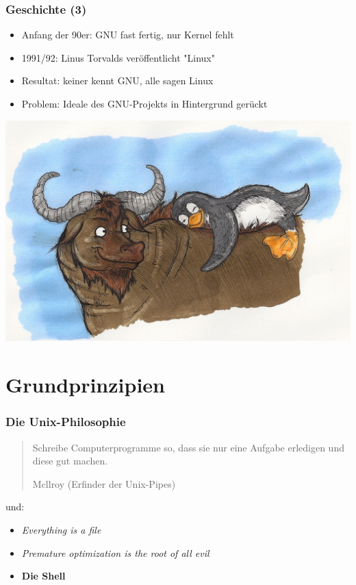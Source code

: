 \documentclass[12pt]{beamer}
\begin{document}
\begin{frame}

	\frametitle{Geschichte (3)}
	
	\begin{itemize}
		\item Anfang der 90er: GNU fast fertig, nur Kernel fehlt
		\item 1991/92: Linus Torvalds veröffentlicht "Linux"
		\item Resultat: keiner kennt GNU, alle sagen Linux
		\item Problem: Ideale des GNU-Projekts in Hintergrund gerückt
	\end{itemize}

	\begin{center}
		\includegraphics[scale=0.4]{src/img/gnulinux}
	\end{center}

\end{frame}

\section{Grundprinzipien}

\begin{frame}

	\frametitle{Die Unix-Philosophie}

	\begin{quote}
		Schreibe Computerprogramme so, dass sie nur eine Aufgabe erledigen
		und diese gut machen.

		\begin{flushright}
			\scriptsize Mcllroy (Erfinder der Unix-Pipes)
		\end{flushright}
	\end{quote}

	\pause

	und:
	\begin{itemize}
		\item\emph{Everything is a file}
		\item\emph{Premature optimization is the root of all evil}
		\pause
		\item\textbf{Die Shell}
	\end{itemize}
\end{frame}
\end{document}
